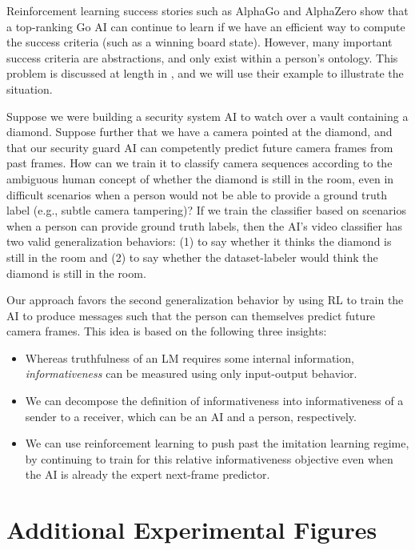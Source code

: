 \documentclass{article}
\begin{document}
Reinforcement learning success stories such as AlphaGo \citep{Silver2016} and AlphaZero \citep{Silver2017} show that a top-ranking Go AI can continue to learn if we have an efficient way to compute the success criteria (such as a winning board state). However, many important success criteria are abstractions, and only exist within a person's ontology. This problem is discussed at length in \citet{christiano2021eliciting}, and we will use their example to illustrate the situation. 

Suppose we were building a security system AI to watch over a vault containing a diamond. Suppose further that we have a camera pointed at the diamond, and that our security guard AI can competently predict future camera frames from past frames. How can we train it to classify camera sequences according to the ambiguous human concept of whether the diamond is still in the room, even in difficult scenarios when a person would not be able to provide a ground truth label (e.g., subtle camera tampering)? If we train the classifier based on scenarios when a person can provide ground truth labels, then the AI's video classifier has two valid generalization behaviors: (1) to say whether it thinks the diamond is still in the room and (2) to say whether the dataset-labeler would think the diamond is still in the room. 

Our approach favors the second generalization behavior by using RL to train the AI to produce messages such that the person can themselves predict future camera frames.
This idea is based on the following three insights:
\begin{itemize}
\item Whereas truthfulness of an LM requires some internal information, \emph{informativeness} can be measured using only input-output behavior.
\item We can decompose the definition of informativeness into informativeness of a sender to a receiver, which can be an AI and a person, respectively.
\item We can use reinforcement learning to push past the imitation learning regime, by continuing to train for this relative informativeness objective even when the AI is already the expert next-frame predictor.
\end{itemize}

\section{Additional Experimental Figures}
\label{app:additional_figures}
\end{document}
